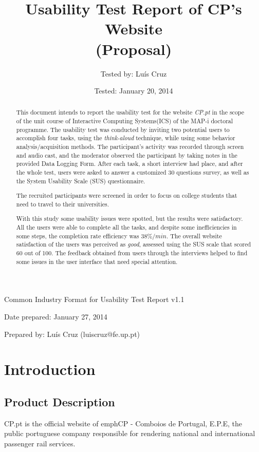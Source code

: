 \documentclass[a4paper]{article}
\title{Usability Test Report of CP's Website\\ (Proposal)}
\author[1]{Tested by: Luís  Cruz}
\affil[1]{MAP-i\\ Joint Doctoral Programme in Computer Science}
\date{Tested: January 20, 2014}
\begin{document}
\maketitle

Common Industry Format for Usability Test Report v1.1

Date prepared: January 27, 2014

Prepared by: Luís Cruz (luiscruz@fe.up.pt)

\begin{abstract}
	
	This document intends to report the usability test for the website \emph{CP.pt} in the scope of the unit course of Interactive Computing Systems(ICS) of the MAP-i doctoral programme. The usability test was conducted by inviting two potential users to accomplish four tasks, using the \emph{think-aloud} technique, while using some behavior analysis/acquisition methods. The participant's activity was recorded through screen and audio cast, and the moderator observed the participant by taking notes in the provided Data Logging Form. After each task, a short interview had place, and after the whole test, users were asked to answer a customized 30 questions survey, as well as the System Usability Scale (SUS) questionnaire.

The recruited participants were screened in order to focus on college students that need to travel to their universities. 

With this study some usability issues were spotted, but the results were satisfactory. All the users were able to complete all the tasks, and despite some inefficiencies in some steps, the completion rate efficiency was $38\%/min$.
The overall website satisfaction of the users was perceived as \emph{good}, assessed using the SUS scale that scored 60 out of 100. The feedback obtained from users through the interviews helped to find some issues in the user interface that need special attention.
\end{abstract}

\section{Introduction}
\subsection{Product Description}

CP.pt is the official website of emph{CP - Comboios de Portugal, E.P.E}, the public portuguese company responsible for rendering national and international passenger rail services.
\end{document}
